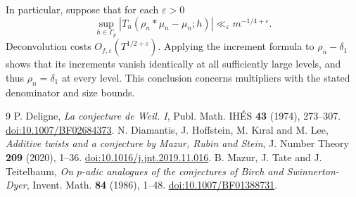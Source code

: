 \documentclass[11pt]{article}
\begin{document}
In particular, suppose that for each \(\varepsilon>0\)
\[
 \sup_{h\in\Gamma_p}|T_n(\rho_n*\mu_n-\mu_n;h)|
                  \ll_\varepsilon m^{-1/4+\varepsilon}.
\]
Deconvolution costs \(O_{f,\varepsilon}(T^{1/2+\varepsilon})\).
Applying the increment formula to \(\rho_n-\delta_1\) shows that its
increments vanish identically at all sufficiently large levels,
and thus \(\rho_n=\delta_1\) at every level. This conclusion concerns
multipliers with the stated denominator and size bounds.

\begin{thebibliography}{9}
P. Deligne, \emph{La conjecture de Weil. I},
Publ. Math. IH\'ES \textbf{43} (1974), 273--307.
\href{https://doi.org/10.1007/BF02684373}{doi:10.1007/BF02684373}.
N. Diamantis, J. Hoffstein, M. K{\i}ral and M. Lee,
\emph{Additive twists and a conjecture by Mazur, Rubin and Stein},
J. Number Theory \textbf{209} (2020), 1--36.
\href{https://doi.org/10.1016/j.jnt.2019.11.016}{doi:10.1016/j.jnt.2019.11.016}.
B. Mazur, J. Tate and J. Teitelbaum,
\emph{On \(p\)-adic analogues of the conjectures of Birch and Swinnerton-Dyer},
Invent. Math. \textbf{84} (1986), 1--48.
\href{https://doi.org/10.1007/BF01388731}{doi:10.1007/BF01388731}.
\end{thebibliography}
\end{document}
